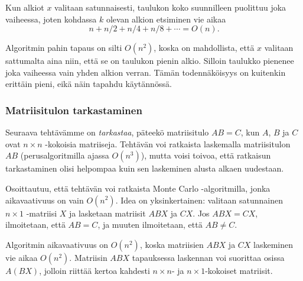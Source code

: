 Kun alkiot $x$ valitaan satunnaisesti,
taulukon koko suunnilleen puolittuu
joka vaiheessa, joten kohdassa $k$ olevan
alkion etsiminen vie aikaa
\[n+n/2+n/4+n/8+\cdots=O(n).\]

Algoritmin pahin tapaus on silti $O(n^2)$,
koska on mahdollista,
että $x$ valitaan sattumalta aina niin,
että se on taulukon pienin alkio.
Silloin taulukko pienenee joka vaiheessa
vain yhden alkion verran.
Tämän todennäköisyys on kuitenkin erittäin pieni,
eikä näin tapahdu käytännössä.

\subsubsection{Matriisitulon tarkastaminen}


Seuraava tehtävämme on \emph{tarkastaa},
päteekö matriisitulo $AB=C$, kun $A$, $B$ ja $C$
ovat $n \times n$ -kokoisia matriiseja.
Tehtävän voi ratkaista laskemalla matriisitulon
$AB$ (perusalgoritmilla ajassa $O(n^3)$), mutta voisi toivoa,
että ratkaisun tarkastaminen olisi helpompaa
kuin sen laskeminen alusta alkaen uudestaan.

Osoittautuu, että tehtävän voi ratkaista
Monte Carlo -algoritmilla,
jonka aikavaativuus on vain $O(n^2)$.
Idea on yksinkertainen: valitaan satunnainen
$n \times 1$ -matriisi $X$ ja lasketaan
matriisit $ABX$ ja $CX$.
Jos $ABX=CX$, ilmoitetaan, että $AB=C$,
ja muuten ilmoitetaan, että $AB \neq C$.

Algoritmin aikavaativuus on $O(n^2)$,
koska matriisien $ABX$ ja $CX$ laskeminen
vie aikaa $O(n^2)$.
Matriisin $ABX$ tapauksessa laskennan
voi suorittaa osissa $A(BX)$, jolloin riittää
kertoa kahdesti $n \times n$- ja $n \times 1$-kokoiset
matriisit.


